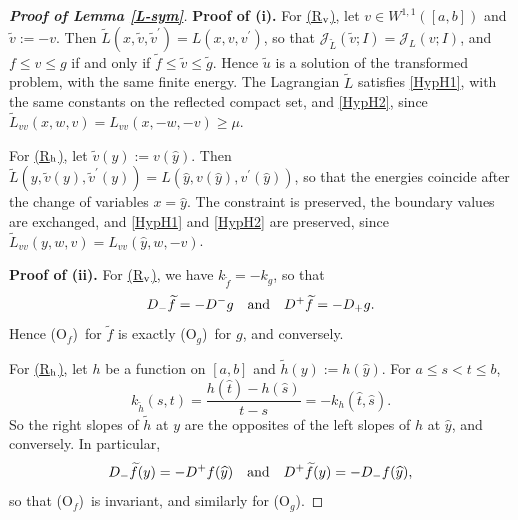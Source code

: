 \documentclass[reqno,12pt]{amsart}
\numberwithin{equation}{section}
\def\J{\mathcal{J}_L}
\def\Of{{\sf (O$_f$)}}
\newcommand{\Rv}{\hyperref[HypS1]{{\sf (R$_{\rm v}$)}}}
\newcommand{\Rh}{\hyperref[HypS2]{{\sf (R$_{\rm h}$)}}}
\def\Og{{\sf (O$_g$)}}
\theoremstyle{remark}
\begin{document}
\begin{proof}[\bf Proof of Lemma \ref{L-sym}]
{\bf Proof of (i).} For \Rv{}, let $v\in W^{1,1}([a,b])$ and $\widetilde v:=-v$. Then $\widetilde L(x,\widetilde v,\widetilde v^\prime)=L(x,v,v^\prime)$, so that $\mathcal{J}_{\widetilde L}(\widetilde v;I)=\J(v;I)$, and $f\leq v\leq g$ if and only if $\widetilde f\leq\widetilde v\leq\widetilde g$. Hence $\widetilde u$ is a solution of the transformed problem, with the same finite energy. The Lagrangian $\widetilde L$ satisfies \ref{HypH1}, with the same constants on the reflected compact set, and \ref{HypH2}, since $\widetilde L_{vv}(x,w,v)=L_{vv}(x,-w,-v)\geq\mu$.

\smallskip

For \Rh{}, let $\widetilde v(y):=v(\widehat y)$. Then $\widetilde L(y,\widetilde v(y),\widetilde v^\prime(y))=L(\widehat y,v(\widehat y),v^\prime(\widehat y))$, so that the energies coincide after the change of variables $x=\widehat y$. The constraint is preserved, the boundary values are exchanged, and \ref{HypH1} and \ref{HypH2} are preserved, since $\widetilde L_{vv}(y,w,v)=L_{vv}(\widehat y,w,-v)$.

\medskip

{\bf Proof of (ii).} For \Rv{}, we have $k_{\widetilde f}=-k_g$, so that
\begin{equation*}
D_-\widetilde f=-D^-g\quad\hbox{and}\quad D^+\widetilde f=-D_+g.
\end{equation*}
Hence \Of\ for $\widetilde f$ is exactly \Og\ for $g$, and conversely.

\smallskip

For \Rh{}, let $h$ be a function on $[a,b]$ and $\widetilde h(y):=h(\widehat y)$. For $a\leq s<t\leq b$,
\begin{equation}\label{slope-reflection}
k_{\widetilde h}(s,t)=\frac{h(\widehat t)-h(\widehat s)}{t-s}=-k_h(\widehat t,\widehat s).
\end{equation}
So the right slopes of $\widetilde h$ at $y$ are the opposites of the left slopes of $h$ at $\widehat y$, and conversely. In particular,
\begin{equation*}
D_-\widetilde f(y)=-D^+f(\widehat y)\quad\hbox{and}\quad D^+\widetilde f(y)=-D_-f(\widehat y),
\end{equation*}
so that \Of\ is invariant, and similarly for \Og.

\medskip


\end{proof}
\end{document}
